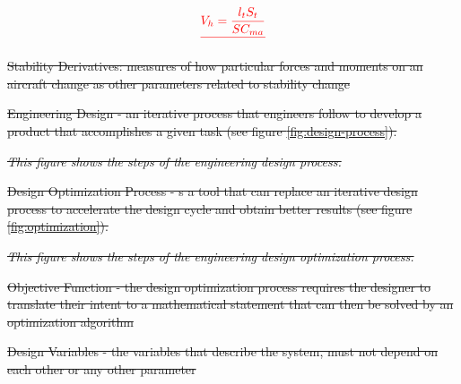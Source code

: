 \documentclass[journal]{new-aiaa} %
\providecommand{\DIFdel}[1]{{\protect\color{red}\sout{#1}}}                      %
\providecommand{\DIFaddbegin}{} %
\providecommand{\DIFaddend}{} %
\providecommand{\DIFdelend}{} %
\providecommand{\DIFdelFL}[1]{\DIFdel{#1}} %
\newcommand{\DIFaddincludegraphics}[2][]{{\color{blue}\fbox{\DIFOincludegraphics[#1]{#2}}}} %
\DeclareRobustCommand{\DIFaddbegin}{\DIFOaddbegin \let\includegraphics\DIFaddincludegraphics} %
\DeclareRobustCommand{\DIFaddend}{\DIFOaddend \let\includegraphics\DIFOincludegraphics} %
\DeclareRobustCommand{\DIFdelend}{\DIFOaddend \let\includegraphics\DIFOincludegraphics} %
\begin{document}
\begin{displaymath}
			\DIFdel{V_h = \frac{l_tS_t}{SC_{ma}}
		}\end{displaymath}%

\item%
\DIFdel{Stability Derivatives: measures of how particular forces and moments on an aircraft change as other parameters related to stability change
		}%

\item%
\DIFdel{Engineering Design - an iterative process that engineers follow to develop a product that accomplishes a given task (see figure \ref{fig:design-process}). }%

{%
\emph{\DIFdelFL{This figure shows the steps of the engineering design process.}}%
}

\item%
\DIFdel{Design Optimization Process - s a tool that can replace an iterative design
		process to accelerate the design cycle and obtain better results (see figure \ref{fig:optimization}).}%

{%
\emph{\DIFdelFL{This figure shows the steps of the engineering design optimization process.}}%
}

\item%
\DIFdel{Objective Function - the design optimization process requires the designer to translate their intent to a mathematical statement that can then be solved by an optimization algorithm
		}%
\item%
\DIFdel{Design Variables - the variables that describe the system, must not depend on each other or any other parameter
		}%

\DIFdelend \DIFaddbegin \appendix
	\DIFaddend 

	
	
\end{document}
